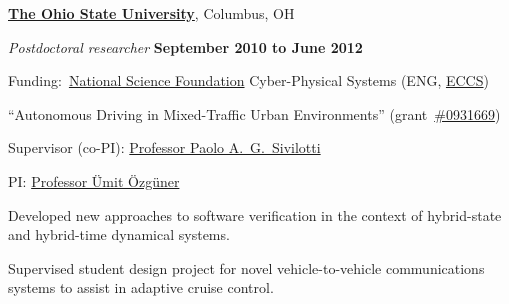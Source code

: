 \documentclass{article}
\newcommand{\halfblankline}{\quad\vspace{-0.5\baselineskip}\pagebreak[3]}
\begin{document}
\href{http://www.osu.edu/}{\textbf{The Ohio State University}},
Columbus, OH
\begin{outerlist}

    \item[] \textit{Postdoctoral researcher}%
            \hfill \textbf{September 2010 to June 2012}
            \begin{innerlist}
                \item Funding:~\href{http://www.nfs.gov/}{National Science Foundation} Cyber-Physical Systems (ENG, \href{http://www.nsf.gov/div/index.jsp?div=eccs}{ECCS})
                \begin{innerlist}
                    \item[$-$] ``Autonomous Driving in Mixed-Traffic Urban Environments''
                        (grant~\href{http://www.nsf.gov/awardsearch/showAward.do?AwardNumber=0931669}{\#0931669})
                    \item[$-$] Supervisor (co-PI):
                        \href{http://www.cse.ohio-state.edu/~paolo/}%
                             {Professor Paolo A.~G.~Sivilotti}
                    \item[$-$] PI:
                        \href{http://www.ece.ohio-state.edu/~umit/}%
                             {Professor \"{U}mit \"{O}zg\"{u}ner}
                \end{innerlist}

                \item Developed new approaches to software verification
                    in the context of hybrid-state and hybrid-time
                    dynamical systems.

                \item Supervised student design project for
                    novel vehicle-to-vehicle communications
                    systems to assist in adaptive cruise control.
            \end{innerlist}

\end{outerlist}

\halfblankline
\end{document}
